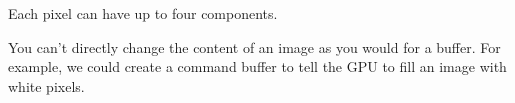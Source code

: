 \documentclass{article}
\begin{document}
Each pixel can have up to four components.

You can't directly change the content of an image as you would for a buffer.
For example, we could create a command buffer to tell the GPU to fill an image with white pixels.

\end{document}
